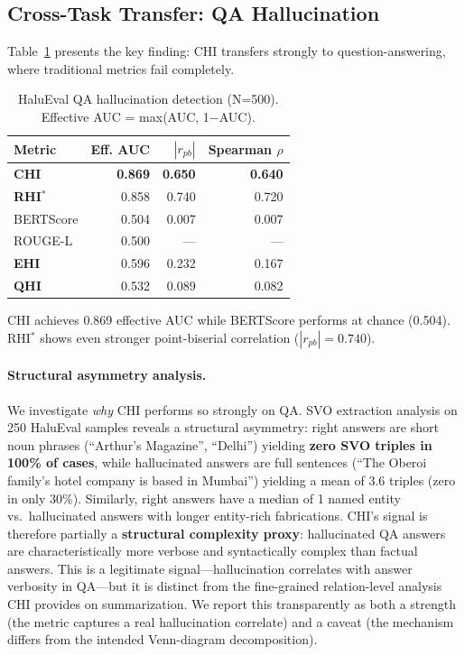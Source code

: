 \documentclass[11pt]{article}
\begin{document}
\subsection{Cross-Task Transfer: QA Hallucination}

Table~\ref{tab:halueval} presents the key finding: CHI transfers strongly to question-answering, where traditional metrics fail completely.

\begin{table}[h]
\centering
\caption{HaluEval QA hallucination detection (N=500). Effective AUC = max(AUC, 1$-$AUC).}
\label{tab:halueval}
\begin{tabular}{lrrr}
\toprule
\textbf{Metric} & \textbf{Eff. AUC} & \textbf{$|r_{pb}|$} & \textbf{Spearman $\rho$} \\
\midrule
\textbf{CHI} & \textbf{0.869} & \textbf{0.650} & \textbf{0.640} \\
\textbf{RHI$^*$} & 0.858 & 0.740 & 0.720 \\
BERTScore & 0.504 & 0.007 & 0.007 \\
ROUGE-L & 0.500 & --- & --- \\
\textbf{EHI} & 0.596 & 0.232 & 0.167 \\
\textbf{QHI} & 0.532 & 0.089 & 0.082 \\
\bottomrule
\end{tabular}
\end{table}

CHI achieves 0.869 effective AUC while BERTScore performs at chance (0.504). RHI$^*$ shows even stronger point-biserial correlation ($|r_{pb}|=0.740$).

\paragraph{Structural asymmetry analysis.} We investigate \emph{why} CHI performs so strongly on QA. SVO extraction analysis on 250 HaluEval samples reveals a structural asymmetry: right answers are short noun phrases (``Arthur's Magazine'', ``Delhi'') yielding \textbf{zero SVO triples in 100\% of cases}, while hallucinated answers are full sentences (``The Oberoi family's hotel company is based in Mumbai'') yielding a mean of 3.6 triples (zero in only 30\%). Similarly, right answers have a median of 1 named entity vs.\ hallucinated answers with longer entity-rich fabrications. CHI's signal is therefore partially a \textbf{structural complexity proxy}: hallucinated QA answers are characteristically more verbose and syntactically complex than factual answers. This is a legitimate signal---hallucination correlates with answer verbosity in QA---but it is distinct from the fine-grained relation-level analysis CHI provides on summarization. We report this transparently as both a strength (the metric captures a real hallucination correlate) and a caveat (the mechanism differs from the intended Venn-diagram decomposition).
\end{document}
